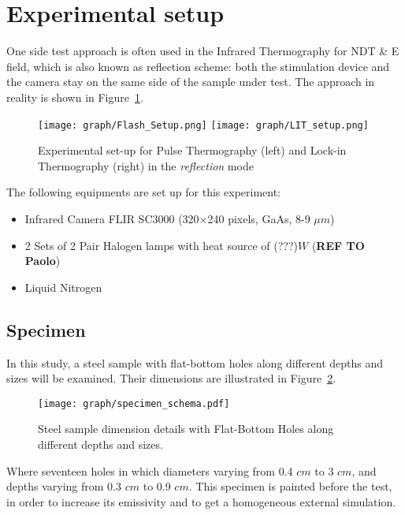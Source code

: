\documentclass[]{spie}  %
\begin{document}
\section{Experimental setup} %
\label{sec:experimental_setup}
One side test approach is often used in the Infrared Thermography for NDT \& E field, which is also known as reflection scheme: both the stimulation device and the camera stay on the same side of the sample under test. The approach in reality is shown in Figure~\ref{Exp_setup}.

\begin{figure}[ht]
   \centering
   \texttt{[image: graph/Flash\_Setup.png]}
   \texttt{[image: graph/LIT\_setup.png]}
   \caption{Experimental set-up for Pulse Thermography (left) and Lock-in Thermography (right) in the \textit{reflection} mode}
   \label{Exp_setup}
\end{figure}

The following equipments are set up for this experiment:
\begin{itemize}
   \item Infrared Camera FLIR SC3000 (320$\times$240 pixels, GaAs, 8-9 $\mu m$)
   \item 2 Sets of 2 Pair Halogen lamps with heat source of (???)$W$ (\textbf{REF TO Paolo})
   \item Liquid Nitrogen
\end{itemize}

\subsection{Specimen} %
\label{sub:specimen}
In this study, a steel sample with flat-bottom holes along different depths and sizes will be examined. Their dimensions are illustrated in Figure~\ref{specimen}.
   \begin{figure}[ht]
   \centering   
   \texttt{[image: graph/specimen\_schema.pdf]}
   \caption{Steel sample dimension details with Flat-Bottom Holes along different depths and sizes.}
    \label{specimen} 
   \end{figure}  
Where seventeen holes in which diameters varying from 0.4 $cm$  to 3 $cm$, and depths varying from 0.3 $cm$ to 0.9 $cm$. This specimen is painted before the test, in order to increase its emissivity and to get a homogeneous external simulation.
\end{document}
